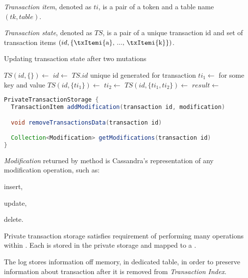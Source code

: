 \begin{definition}
  \label{def:transactionItem}
  \emph{Transaction item}, denoted as $ti$, is a pair of a token and a table name $(tk,table)$.
\end{definition}

\begin{definition}
  \label{def:transactionState}
  \emph{Transaction state}, denoted as $TS$, is a pair of a unique transaction id and set of transaction items $(id, \{ \text{\txItemi{a}, ..., \txItemi{k}} \})$.
\end{definition}



\begin{algorithm}
  \caption{Updating transaction state after two mutations}
  \label{alg:updateTxState}
  \begin{algorithmic}  	    
    \State $TS(id, \{ \}) \gets$ 
    \State $id \gets$ $TS.id$ unique id generated for transaction
    \State $ti_{1} \gets $  \Comment for some key and value
    \State $TS(id, \{ ti_{1} \}) \gets$ 
    \State $ti_{2} \gets $ 
    \State $TS(id, \{ ti_{1}, ti_{2} \}) \gets$  
    \State $result \gets $     
  \end{algorithmic}
\end{algorithm}


\begin{lstlisting}[language=Java,style=outcode,label={lst:privateTransactionStorage},caption={API of private transaction storage}]
PrivateTransactionStorage {
  TransactionItem addModification(transaction id, modification)

  void removeTransactionsData(transaction id)

  Collection<Modification> getModifications(transaction id)        
}

\end{lstlisting}

\emph{Modification} returned by  method is Cassandra's representation of any modification operation, such as: \begin{enumerate*}[label=\alph*)] \item insert, \item update, \item delete. \end{enumerate*}

Private transaction storage satisfies requirement of performing many operations within \transactionj. Each  is stored in the private storage and mapped to a \txItem.



The log stores information off memory, in dedicated table, in order to preserve information about transaction after it is removed from \emph{Transaction Index}.
